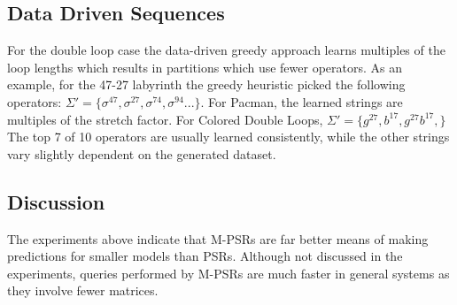 \subsection{Data Driven Sequences}
For the double loop case the data-driven greedy approach learns multiples of the loop lengths which results in partitions which use fewer operators. As an example, for the 47-27 labyrinth the greedy heuristic picked the following operators: $\Sigma'=\{\sigma^{47}, \sigma^{27}, \sigma^{74}, \sigma^{94} ...\}$. For Pacman, the learned strings are multiples of the stretch factor. For Colored Double Loops, $\Sigma' = \{g^{27},b^{17},g^{27}b^{17},\}$ The top 7 of 10 operators are usually learned consistently, while the other strings vary slightly dependent on the generated dataset.

\subsection{Discussion}

The experiments above indicate that M-PSRs are far better means of making predictions for smaller models than PSRs. Although not discussed in the experiments, queries performed by M-PSRs are much faster in general systems as they involve fewer matrices. 

